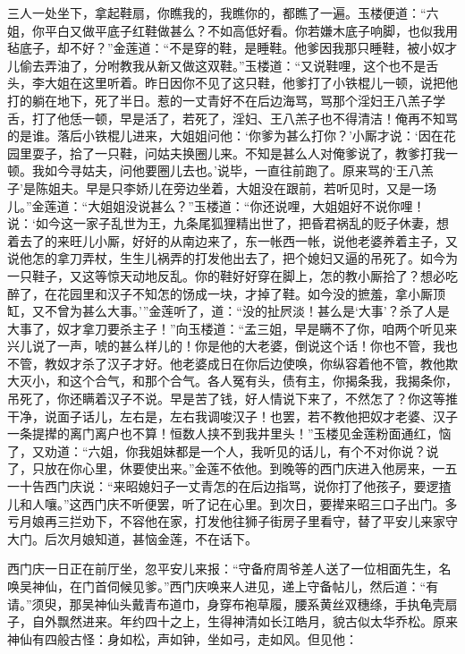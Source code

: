 三人一处坐下，拿起鞋扇，你瞧我的，我瞧你的，都瞧了一遍。玉楼便道：“六姐，你平白又做平底子红鞋做甚么？不如高低好看。你若嫌木底子响脚，也似我用毡底子，却不好？”金莲道：“不是穿的鞋，是睡鞋。他爹因我那只睡鞋，被小奴才儿偷去弄油了，分咐教我从新又做这双鞋。”玉楼道：“又说鞋哩，这个也不是舌头，李大姐在这里听着。昨日因你不见了这只鞋，他爹打了小铁棍儿一顿，说把他打的躺在地下，死了半日。惹的一丈青好不在后边海骂，骂那个淫妇王八羔子学舌，打了他恁一顿，早是活了，若死了，淫妇、王八羔子也不得清洁！俺再不知骂的是谁。落后小铁棍儿进来，大姐姐问他：‘你爹为甚么打你？’小厮才说：‘因在花园里耍子，拾了一只鞋，问姑夫换圈儿来。不知是甚么人对俺爹说了，教爹打我一顿。我如今寻姑夫，问他要圈儿去也。’说毕，一直往前跑了。原来骂的‘王八羔子’是陈姐夫。早是只李娇儿在旁边坐着，大姐没在跟前，若听见时，又是一场儿。”金莲道：“大姐姐没说甚么？”玉楼道：“你还说哩，大姐姐好不说你哩！说：‘如今这一家子乱世为王，九条尾狐狸精出世了，把昏君祸乱的贬子休妻，想着去了的来旺儿小厮，好好的从南边来了，东一帐西一帐，说他老婆养着主子，又说他怎的拿刀弄杖，生生儿祸弄的打发他出去了，把个媳妇又逼的吊死了。如今为一只鞋子，又这等惊天动地反乱。你的鞋好好穿在脚上，怎的教小厮拾了？想必吃醉了，在花园里和汉子不知怎的饧成一块，才掉了鞋。如今没的摭羞，拿小厮顶缸，又不曾为甚么大事。’”金莲听了，道：“没的扯屄淡！甚么是‘大事’？杀了人是大事了，奴才拿刀要杀主子！”向玉楼道：“孟三姐，早是瞒不了你，咱两个听见来兴儿说了一声，唬的甚么样儿的！你是他的大老婆，倒说这个话！你也不管，我也不管，教奴才杀了汉子才好。他老婆成日在你后边使唤，你纵容着他不管，教他欺大灭小，和这个合气，和那个合气。各人冤有头，债有主，你揭条我，我揭条你，吊死了，你还瞒着汉子不说。早是苦了钱，好人情说下来了，不然怎了？你这等推干净，说面子话儿，左右是，左右我调唆汉子！也罢，若不教他把奴才老婆、汉子一条提撵的离门离户也不算！恒数人挟不到我井里头！”玉楼见金莲粉面通红，恼了，又劝道：“六姐，你我姐妹都是一个人，我听见的话儿，有个不对你说？说了，只放在你心里，休要使出来。”金莲不依他。到晚等的西门庆进入他房来，一五一十告西门庆说：“来昭媳妇子一丈青怎的在后边指骂，说你打了他孩子，要逻揸儿和人嚷。”这西门庆不听便罢，听了记在心里。到次日，要撵来昭三口子出门。多亏月娘再三拦劝下，不容他在家，打发他往狮子街房子里看守，替了平安儿来家守大门。后次月娘知道，甚恼金莲，不在话下。

西门庆一日正在前厅坐，忽平安儿来报：“守备府周爷差人送了一位相面先生，名唤吴神仙，在门首伺候见爹。”西门庆唤来人进见，递上守备帖儿，然后道：“有请。”须臾，那吴神仙头戴青布道巾，身穿布袍草履，腰系黄丝双穗绦，手执龟壳扇子，自外飘然进来。年约四十之上，生得神清如长江皓月，貌古似太华乔松。原来神仙有四般古怪：身如松，声如钟，坐如弓，走如风。但见他：

